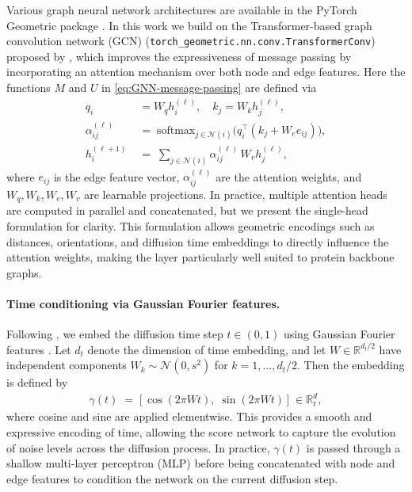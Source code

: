 \documentclass[a4paper,12pt]{article}
\begin{document}
Various graph neural network architectures are available in the PyTorch Geometric package \citep{PyG1.0,PyG2.0}. In this work we build on the Transformer-based graph convolution network (GCN) (\texttt{torch\_geometric.nn.conv.TransformerConv}) proposed by \citet{shi2021MaskedLabelPrediction}, which improves the expressiveness of message passing by incorporating an attention mechanism over both node and edge features. Here the functions \(M\) and \(U\) in \cref{eq:GNN-message-passing} are defined via
\begin{align*}
    q_i \;&= W_q h_i^{(\ell)},\quad k_j = W_k h_j^{(\ell)}, \\
    \alpha_{ij}^{(\ell)} \;&=\; \mathrm{softmax}_{j \in \mathcal{N}(i)} 
    \big( q_i^{\top} (k_j + W_e e_{ij}) \big), \\
    h_i^{(\ell+1)} \;&=\; \sum_{j \in \mathcal{N}(i)} 
    \alpha_{ij}^{(\ell)} \, W_v h_j^{(\ell)},
\end{align*}
where \(e_{ij}\) is the edge feature vector, \(\alpha_{ij}^{(\ell)}\) are the attention weights, and \(W_q, W_k, W_e, W_v\) are learnable projections. In practice, multiple attention heads are computed in parallel and concatenated, but we present the single-head formulation for clarity. This formulation allows geometric encodings such as distances, orientations, and diffusion time embeddings to directly influence the attention weights, making the layer particularly well suited to protein backbone graphs.

\paragraph{Time conditioning via Gaussian Fourier features.}
Following \citet{song2021ScoreBasedGenerativeModeling}, we embed the diffusion time step \(t \in (0,1)\) using Gaussian Fourier features \citep{tancikFourierFeaturesLet2020}. Let \(d_{t}\) denote the dimension of time embedding, and let \(W \in \mathbb{R}^{d_{t}/2}\) have independent components \(W_k \sim \mathcal{N}(0,s^2)\) for \(k=1,...,d_{t}/2\). Then the embedding is defined by
\begin{align}\label{eq:time-embedding}
    \gamma(t) \;=\; \big[\, \cos(2\pi W t),\; \sin(2\pi W t)\,\big] \;\in \mathbb{R}^d_t,
\end{align}
where cosine and sine are applied elementwise. This provides a smooth and expressive encoding of time, allowing the score network to capture the evolution of noise levels across the diffusion process. In practice, \(\gamma(t)\) is passed through a shallow multi-layer perceptron (MLP) before being concatenated with node and edge features to condition the network on the current diffusion step.
\end{document}
